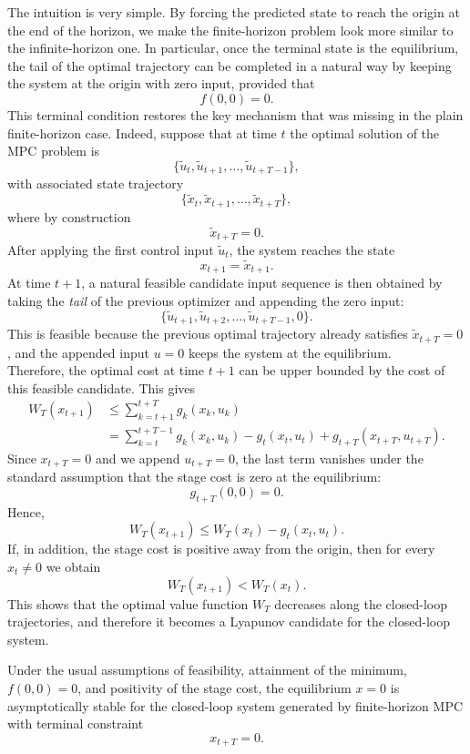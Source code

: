 The intuition is very simple. By forcing the predicted state to reach the origin at the end of the horizon, we make the finite-horizon problem look more similar to the infinite-horizon one. In particular, once the terminal state is the equilibrium, the tail of the optimal trajectory can be completed in a natural way by keeping the system at the origin with zero input, provided that
\[
f(0,0)=0.
\]
This terminal condition restores the key mechanism that was missing in the plain finite-horizon case. Indeed, suppose that at time $t$ the optimal solution of the MPC problem is
\[
\{\tilde u_t,\tilde u_{t+1},\dots,\tilde u_{t+T-1}\},
\]
with associated state trajectory
\[
\{\tilde x_t,\tilde x_{t+1},\dots,\tilde x_{t+T}\},
\]
where by construction
\[
\tilde x_{t+T}=0.
\]
After applying the first control input $\tilde u_t$, the system reaches the state
\[
x_{t+1}=\tilde x_{t+1}.
\]
At time $t+1$, a natural feasible candidate input sequence is then obtained by taking the \emph{tail} of the previous optimizer and appending the zero input:
\[
\{\tilde u_{t+1},\tilde u_{t+2},\dots,\tilde u_{t+T-1},0\}.
\]
This is feasible because the previous optimal trajectory already satisfies $\tilde x_{t+T}=0$, and the appended input $u=0$ keeps the system at the equilibrium.\\
Therefore, the optimal cost at time $t+1$ can be upper bounded by the cost of this feasible candidate. This gives
\begin{align*}
W_T(x_{t+1})
&\le \sum_{k=t+1}^{t+T} g_k(x_k,u_k)\\
&= \sum_{k=t}^{t+T-1} g_k(x_k,u_k) - g_t(x_t,u_t) + g_{t+T}(x_{t+T},u_{t+T}).
\end{align*}
Since $x_{t+T}=0$ and we append $u_{t+T}=0$, the last term vanishes under the standard assumption that the stage cost is zero at the equilibrium:
\[
g_{t+T}(0,0)=0.
\]
Hence,
\[
W_T(x_{t+1}) \le W_T(x_t) - g_t(x_t,u_t).
\]
If, in addition, the stage cost is positive away from the origin, then for every $x_t\neq 0$ we obtain
\[
W_T(x_{t+1}) < W_T(x_t).
\]
This shows that the optimal value function $W_T$ decreases along the closed-loop trajectories, and therefore it becomes a Lyapunov candidate for the closed-loop system.

\begin{theorembox}
Under the usual assumptions of feasibility, attainment of the minimum, $f(0,0)=0$, and positivity of the stage cost, the equilibrium $x=0$ is asymptotically stable for the closed-loop system generated by finite-horizon MPC with terminal constraint
\[
x_{t+T}=0.
\]
\end{theorembox}

